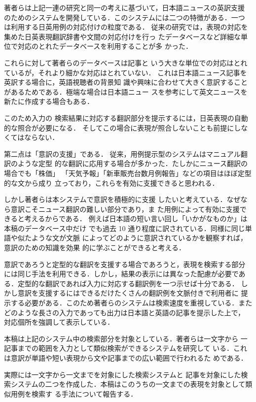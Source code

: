 著者らは上記一連の研究と同一の考えに基づいて，日本語ニュースの英訳支援
のためのシステムを開発している．このシステムには二つの特徴がある．一つ
は利用する日英用例の対応付けの粒度である．
従来の研究では，表現の対応を集めた日英表現翻訳辞書や文間の対応付けを行っ
たデータベースなど詳細な単位で対応のとれたデータベースを利用することが多
かった．

これらに対して著者らのデータベースは記事と
いう大きな単位での対応はとれているが，それより細かな対応はとれていない．
これは日本語ニュース記事を英訳する場合に，英語視聴者の背景知
識や興味に合わせて大きく意訳することがあるためである．極端な場合は日本語ニュー
スを参考にして英文ニュースを新たに作成する場合もある．

このため入力の
検索結果に対応する翻訳部分を提示するには，日英表現の自動的な照合が必要になる．
そしてこの場合に表現が照合しないことも前提にしなくてはならない．

第二点は「意訳の支援」である．
従来，用例提示型のシステムはマニュアル翻訳のような定型
的な翻訳に応用する場合が多かった．たしかにニュース翻訳の場合でも「株価」
「天気予報」「新車販売台数月例報告」などの項目はほぼ定型的な文から成り
立っており，これらを有効に支援できると思われる．

しかし著者らは本システムで意訳を積極的に支援
したいと考えている．なぜなら意訳こそニュース翻訳の難しい部分であり，ま
た用例によって有効に支援できると考えるからである．
例えば日本語の短い言い回し「いかがなものか」は本稿のデータベース中だけ
でも過去 10 通り程度に訳されている．同様に同じ単語や似たような文が文脈
によってどのように意訳されているかを観察すれば，意訳のための知識を効果
的に学ぶことができると考える．

意訳であろうと定型的な翻訳を支援する場合であろうと，表現を検索する部分
には同じ手法を利用できる．しかし，結果の表示には異なった配慮が必要であ
る．定型的な翻訳であれば入力に対応する翻訳例を一つ示せば十分である．
しかし意訳を支援するにはできるだけたくさんの翻訳例を文脈付きで利用者に
提示する必要がある．このため著者らのシステムは検索速度を重視している．また
どのような長さの入力であっても出力は日本語と英語の記事を提示した上で，
対応個所を強調して表示している．


本稿は上記のシステム中の検索部分を対象としている．著者らは一文字から
一記事までの範囲を入力として類似検索ができるシステムを研究して
いる．これは意訳が単語や短い表現から文や記事までの広い範囲で行われるた
めである．

実際には一文字から一文までを対象にした検索システムと
記事を対象にした検索システムの二つを作成した．本稿はこのうちの一文までの表現を対象として類似用例を検索す
る手法について報告する．


